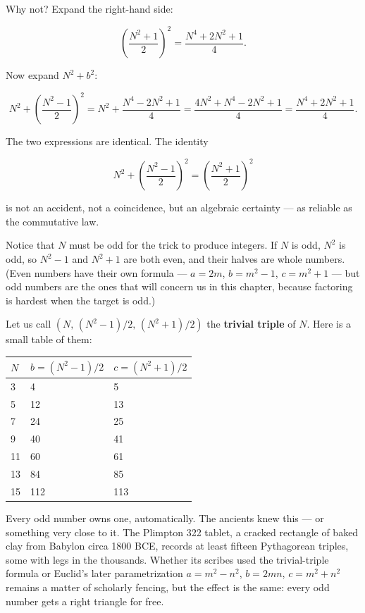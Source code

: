 Why not? Expand the right-hand side:

\[\left(\frac{N^2 + 1}{2}\right)^{\!2} = \frac{N^4 + 2N^2 + 1}{4}.\]

Now expand $N^2 + b^2$:

\[N^2 + \left(\frac{N^2 - 1}{2}\right)^{\!2} = N^2 + \frac{N^4 - 2N^2 + 1}{4} = \frac{4N^2 + N^4 - 2N^2 + 1}{4} = \frac{N^4 + 2N^2 + 1}{4}.\]

The two expressions are identical. The identity

\[N^2 + \left(\frac{N^2 - 1}{2}\right)^{\!2} = \left(\frac{N^2 + 1}{2}\right)^{\!2}\]

is not an accident, not a coincidence, but an algebraic certainty --- as reliable as the commutative law.

Notice that $N$ must be odd for the trick to produce integers. If $N$ is odd, $N^2$ is odd, so $N^2 - 1$ and $N^2 + 1$ are both even, and their halves are whole numbers. (Even numbers have their own formula --- $a = 2m$, $b = m^2 - 1$, $c = m^2 + 1$ --- but odd numbers are the ones that will concern us in this chapter, because factoring is hardest when the target is odd.)

Let us call $(N,\, (N^2-1)/2,\, (N^2+1)/2)$ the \textbf{trivial triple} of $N$. Here is a small table of them:


\begin{center}
\begin{tabular}{lll}
\toprule
$N$ & $b = (N^2-1)/2$ & $c = (N^2+1)/2$ \\
\midrule
3 & 4 & 5 \\
5 & 12 & 13 \\
7 & 24 & 25 \\
9 & 40 & 41 \\
11 & 60 & 61 \\
13 & 84 & 85 \\
15 & 112 & 113 \\
\bottomrule
\end{tabular}
\end{center}


Every odd number owns one, automatically. The ancients knew this --- or something very close to it. The Plimpton 322 tablet, a cracked rectangle of baked clay from Babylon circa 1800 BCE, records at least fifteen Pythagorean triples, some with legs in the thousands. Whether its scribes used the trivial-triple formula or Euclid's later parametrization $a = m^2 - n^2$, $b = 2mn$, $c = m^2 + n^2$ remains a matter of scholarly fencing, but the effect is the same: every odd number gets a right triangle for free.


